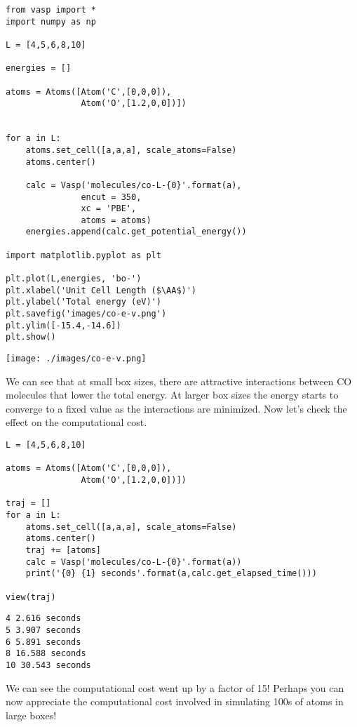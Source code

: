 \documentclass[11pt]{article}
\begin{document}
\begin{verbatim}
from vasp import *
import numpy as np

L = [4,5,6,8,10]

energies = []

atoms = Atoms([Atom('C',[0,0,0]),
               Atom('O',[1.2,0,0])])


for a in L:
    atoms.set_cell([a,a,a], scale_atoms=False)
    atoms.center()

    calc = Vasp('molecules/co-L-{0}'.format(a),
               encut = 350,
               xc = 'PBE',
               atoms = atoms)
    energies.append(calc.get_potential_energy())
        
import matplotlib.pyplot as plt

plt.plot(L,energies, 'bo-')
plt.xlabel('Unit Cell Length ($\AA$)')
plt.ylabel('Total energy (eV)')
plt.savefig('images/co-e-v.png')
plt.ylim([-15.4,-14.6])
plt.show()
\end{verbatim}

\begin{center}
\texttt{[image: ./images/co-e-v.png]}
\end{center}


We can see that at small box sizes, there are attractive interactions between CO molecules that lower the total energy. At larger box sizes the energy starts to converge to a fixed value as the interactions are minimized. Now let's check the effect on the computational cost.

\begin{verbatim}
L = [4,5,6,8,10]

atoms = Atoms([Atom('C',[0,0,0]),
               Atom('O',[1.2,0,0])])

traj = []
for a in L:
    atoms.set_cell([a,a,a], scale_atoms=False)
    atoms.center()
    traj += [atoms]
    calc = Vasp('molecules/co-L-{0}'.format(a))
    print('{0} {1} seconds'.format(a,calc.get_elapsed_time()))
    
view(traj)
\end{verbatim}

\begin{verbatim}
4 2.616 seconds
5 3.907 seconds
6 5.891 seconds
8 16.588 seconds
10 30.543 seconds
\end{verbatim}

We can see the computational cost went up by a factor of 15! Perhaps you can now appreciate the computational cost involved in simulating 100s of atoms in large boxes!
\end{document}
